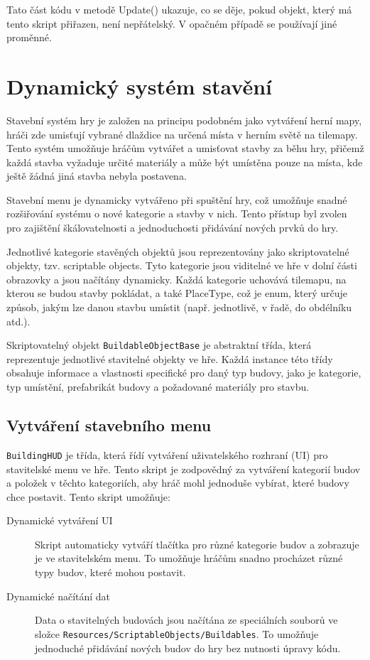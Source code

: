 Tato část kódu v metodě Update() ukazuje, co se děje, pokud objekt, který má tento skript přiřazen, není nepřátelský. V opačném případě se používají jiné proměnné.

\section{Dynamický systém stavění}
\label{buildingSystem}
Stavební systém hry je založen na principu podobném jako vytváření herní mapy, hráči zde umisťují vybrané dlaždice na určená místa v herním světě na tilemapy. Tento systém umožňuje hráčům vytvářet a umisťovat stavby za běhu hry, přičemž každá stavba vyžaduje určité materiály a může být umístěna pouze na místa, kde ještě žádná jiná stavba nebyla postavena.

Stavební menu je dynamicky vytvářeno při spuštění hry, což umožňuje snadné rozšiřování systému o nové kategorie a stavby v nich. Tento přístup byl zvolen pro zajištění škálovatelnosti a jednoduchosti přidávání nových prvků do hry.

Jednotlivé kategorie stavěných objektů jsou reprezentovány jako skriptovatelné objekty, tzv. scriptable objects. Tyto kategorie jsou viditelné ve hře v dolní části obrazovky a jsou načítány dynamicky. Každá kategorie uchovává tilemapu, na kterou se budou stavby pokládat, a také PlaceType, což je enum, který určuje způsob, jakým lze danou stavbu umístit (např. jednotlivě, v řadě, do obdélníku atd.).

Skriptovatelný objekt \texttt{BuildableObjectBase} je abstraktní třída, která reprezentuje jednotlivé stavitelné objekty ve hře. Každá instance této třídy obsahuje informace a vlastnosti specifické pro daný typ budovy, jako je kategorie, typ umístění, prefabrikát budovy a požadované materiály pro stavbu.

\subsection{Vytváření stavebního menu}
\texttt{BuildingHUD} je třída, která řídí vytváření uživatelského rozhraní (UI) pro stavitelské menu ve hře. Tento skript je zodpovědný za vytváření kategorií budov a položek v těchto kategoriích, aby hráč mohl jednoduše vybírat, které budovy chce postavit. Tento skript umožňuje:

\begin{description}
	\item[Dynamické vytváření UI] Skript automaticky vytváří tlačítka pro různé kategorie budov a zobrazuje je ve stavitelském menu. To umožňuje hráčům snadno procházet různé typy budov, které mohou postavit.
	\item[Dynamické načítání dat] Data o stavitelných budovách jsou načítána ze speciálních souborů ve složce \texttt{Resources/ScriptableObjects/Buildables}. To umožňuje jednoduché přidávání nových budov do hry bez nutnosti úpravy kódu.
\end{description}

